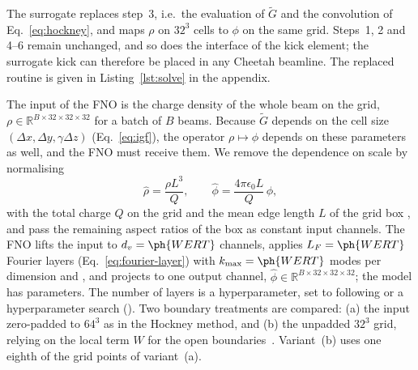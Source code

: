 The surrogate replaces step~3, i.e.\ the evaluation of $\tilde G$ and the
convolution of Eq.~\eqref{eq:hockney}, and maps $\rho$ on $32^3$ cells to
$\phi$ on the same grid. Steps~1, 2 and 4--6 remain unchanged, and so does
the interface of the kick element; the surrogate kick can therefore be
placed in any Cheetah beamline. The replaced routine is given in
Listing~\ref{lst:solve} in the appendix.

\label{sec:method-fno}
The input of the FNO is the charge density of the whole beam on the grid,
$\rho\in\mathbb{R}^{B\times32\times32\times32}$ for a batch of $B$ beams.
Because $\tilde G$ depends on the cell size $(\Delta x,\Delta y,
\gamma\Delta z)$ (Eq.~\eqref{eq:igf}), the operator $\rho\mapsto\phi$
depends on these parameters as well, and the FNO must receive them. We
remove the dependence on scale by normalising
\begin{equation}
  \hat\rho = \frac{\rho L^3}{Q}, \qquad
  \hat\phi = \frac{4\pi\epsilon_0 L}{Q}\,\phi,
  \label{eq:nondim}
\end{equation}
with the total charge $Q$ on the grid and the mean edge length $L$ of the
grid box , and pass
the remaining aspect ratios of the box as constant input channels.
The FNO lifts the input to $d_v=\ph{WERT}$ channels, applies $L_F=\ph{WERT}$
Fourier layers (Eq.~\eqref{eq:fourier-layer}) with
$k_\mathrm{max}=\ph{WERT}$ modes per dimension and ,
and projects to one output channel, $\hat\phi\in
\mathbb{R}^{B\times32\times32\times32}$; the model has  parameters.
The number of layers is a hyperparameter, set to  following
 or a hyperparameter search ().
Two boundary treatments are compared: (a) the input zero-padded to $64^3$
as in the Hockney method, and (b) the unpadded $32^3$ grid, relying on the
local term $W$ for the open boundaries~\cite{li2021fno}. Variant~(b) uses
one eighth of the grid points of variant~(a).


